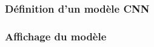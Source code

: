 
\begin{frame}
  \frametitle{Définition d'un modèle CNN}
\end{frame}

\begin{frame}
  \frametitle{Affichage du modèle}
\end{frame}
